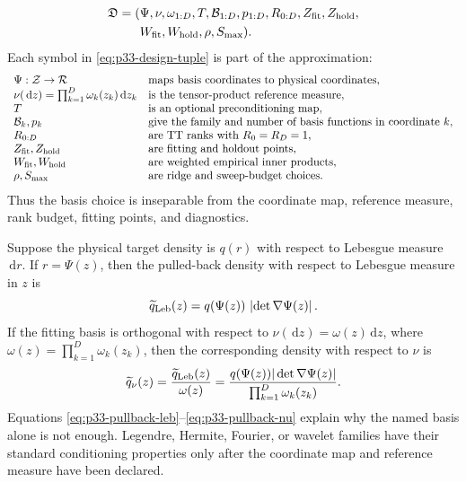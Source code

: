 \documentclass[11pt]{article}
\numberwithin{equation}{section}
\newcommand{\dd}{\,\mathrm d}
\begin{document}
\begin{equation}
\begin{aligned}
    \mathfrak D
    =
    (&\Psi,\nu,\omega_{1:D},T,\mathcal B_{1:D},p_{1:D},R_{0:D},
      Z_{\rm fit},Z_{\rm hold},\\
     &W_{\rm fit},W_{\rm hold},\rho,S_{\max}).
\end{aligned}
    \label{eq:p33-design-tuple}
\end{equation}
Each symbol in \eqref{eq:p33-design-tuple} is part of the approximation:
\begin{equation}
\begin{array}{ll}
\Psi:\mathcal Z\to\mathcal R & \text{maps basis coordinates to physical coordinates},\\
\nu(\dd z)=\prod_{k=1}^D \omega_k(z_k)\dd z_k
    & \text{is the tensor-product reference measure},\\
T & \text{is an optional preconditioning map},\\
\mathcal B_k,p_k & \text{give the family and number of basis functions in coordinate }k,\\
R_{0:D} & \text{are TT ranks with }R_0=R_D=1,\\
Z_{\rm fit},Z_{\rm hold} & \text{are fitting and holdout points},\\
W_{\rm fit},W_{\rm hold} & \text{are weighted empirical inner products},\\
\rho,S_{\max} & \text{are ridge and sweep-budget choices}.
\end{array}
    \label{eq:p33-design-table}
\end{equation}
Thus the basis choice is inseparable from the coordinate map, reference
measure, rank budget, fitting points, and diagnostics.

Suppose the physical target density is \(q(r)\) with respect to Lebesgue
measure \(\dd r\).  If \(r=\Psi(z)\), then the pulled-back density with
respect to Lebesgue measure in \(z\) is
\begin{equation}
    \widetilde q_{\rm Leb}(z)
    =
    q(\Psi(z))\,\left|\det\nabla\Psi(z)\right|.
    \label{eq:p33-pullback-leb}
\end{equation}
If the fitting basis is orthogonal with respect to
\(\nu(\dd z)=\omega(z)\dd z\), where
\(\omega(z)=\prod_{k=1}^D\omega_k(z_k)\), then the corresponding density with
respect to \(\nu\) is
\begin{equation}
    \widetilde q_{\nu}(z)
    =
    \frac{\widetilde q_{\rm Leb}(z)}{\omega(z)}
    =
    \frac{q(\Psi(z))|\det\nabla\Psi(z)|}
         {\prod_{k=1}^D\omega_k(z_k)}.
    \label{eq:p33-pullback-nu}
\end{equation}
Equations \eqref{eq:p33-pullback-leb}--\eqref{eq:p33-pullback-nu} explain why
the named basis alone is not enough.  Legendre, Hermite, Fourier, or wavelet
families have their standard conditioning properties only after the coordinate
map and reference measure have been declared.
\end{document}
